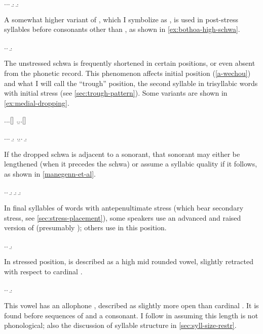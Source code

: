 \ex.\a.\a.\label{di-meurz}
\b.\label{achalese}
\b.\label{paper}

A somewhat higher variant of \ipa{[ə]}, which I symbolize as \ipa{[ə̝]}, is used in post-stress syllables before consonants other than \ipa{[r]}, as shown in \cref{ex:bothoa-high-schwa}.

\ex.\label{ex:bothoa-high-schwa}\a.
\b.


The unstressed schwa is frequently shortened in certain positions, or even absent from the phonetic record. This phenomenon affects initial position (\cref{a-wechou}) and what I will call the \enquote{trough} position, \ie the second syllable in trisyllabic words with initial stress (see \cref{sec:trough-pattern}). Some variants are shown in \cref{ex:medial-dropping}.

\ex.\label{a-wechou}\a.\a.[]
\z.\b.\a.[]

\ex.\label{ex:medial-dropping}\a.\a.
\b.
\z.\b.\a.
\b.


If the dropped schwa is adjacent to a sonorant, that sonorant may either be lengthened (when it precedes the schwa) or assume a syllabic quality if it follows, as shown in \cref{manegenn-et-al}.

\ex.\label{manegenn-et-al}\a.
\b.
\b.
\b.

In final syllables of words with antepenultimate stress (which bear secondary stress, see \cref{sec:stress-placement}), some speakers use an advanced and raised version of  (presumably ); others use  in this position.

\ex.\a.
\b.

In stressed position, \ipa{[ø]} is described as a high mid rounded vowel, slightly retracted with respect to cardinal \ipa{[ø]}.

\ex.\a.
\b.

This vowel has an allophone , described as slightly more open than cardinal \ipa{[œ]}. It is found before sequences of \ipa{[r]} and a consonant. I follow \citet{humphreys95:_phonol_bothoa_saint_nicol_pelem} in assuming this length is not phonological; \cf also the discussion of syllable structure in \cref{sec:syll-size-restr}.

